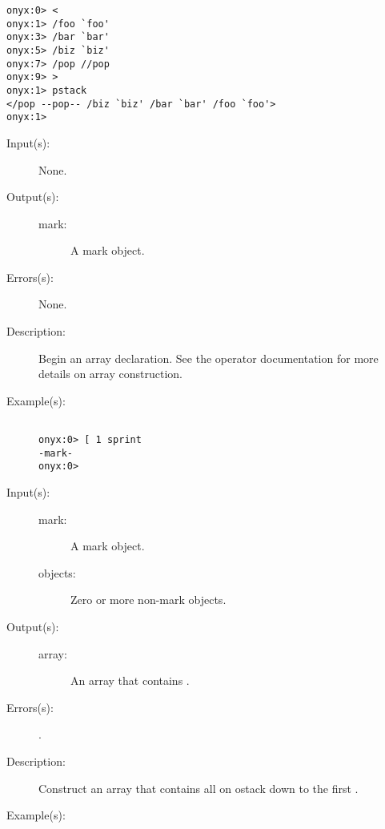 \begin{description}
\begin{description}
\begin{verbatim}
onyx:0> <
onyx:1> /foo `foo'
onyx:3> /bar `bar'
onyx:5> /biz `biz'
onyx:7> /pop //pop
onyx:9> >
onyx:1> pstack
</pop --pop-- /biz `biz' /bar `bar' /foo `foo'>
onyx:1>
		\end{verbatim}
	\end{description}
\label{systemdict:sym_lb}
\index{[@\onyxop{}{{\lb}}{}}
\item[{\onyxop{--}{{\lb}}{mark}}: ]
	\begin{description}\item[]
	\item[Input(s): ] None.
	\item[Output(s): ]
		\begin{description}\item[]
		\item[mark: ]
			A mark object.
		\end{description}
	\item[Errors(s): ] None.
	\item[Description: ]
		Begin an array declaration.  See the
		\htmlref{\onyxop{}{]}{}}{systemdict:sym_rb} operator
		documentation for more details on array construction.
	\item[Example(s): ]\begin{verbatim}

onyx:0> [ 1 sprint
-mark-
onyx:0>
		\end{verbatim}
	\end{description}
\label{systemdict:sym_rb}
\index{]@\onyxop{}{{\rb}}{}}
\item[{\onyxop{mark objects}{{\rb}}{array}}: ]
	\begin{description}\item[]
	\item[Input(s): ]
		\begin{description}\item[]
		\item[mark: ]
			A mark object.
		\item[objects: ]
			Zero or more non-mark objects.
		\end{description}
	\item[Output(s): ]
		\begin{description}\item[]
		\item[array: ]
			An array that contains .
		\end{description}
	\item[Errors(s): ]
		\begin{description}\item[]
		\item[.]
		\end{description}
	\item[Description: ]
		Construct an array that contains all  on ostack
		down to the first .
	\item[Example(s): ]\begin{verbatim}


\end{verbatim}
\end{description}
\end{description}
